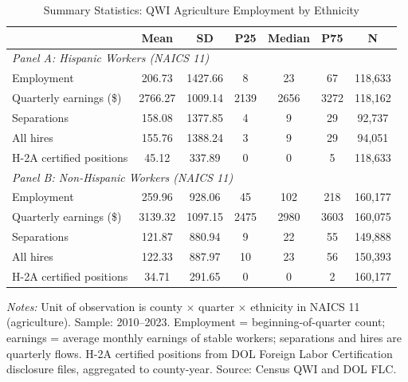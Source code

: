 \begin{table}[htbp]
\centering
\caption{Summary Statistics: QWI Agriculture Employment by Ethnicity}
\label{tab:sumstats}
\small
\begin{tabular}{lcccccc}
\hline\hline
 & Mean & SD & P25 & Median & P75 & N \\
\hline
\multicolumn{7}{l}{\textit{Panel A: Hispanic Workers (NAICS 11)}} \\
Employment & 206.73 & 1427.66 & 8 & 23 & 67 & 118,633 \\
Quarterly earnings (\$) & 2766.27 & 1009.14 & 2139 & 2656 & 3272 & 118,162 \\
Separations & 158.08 & 1377.85 & 4 & 9 & 29 & 92,737 \\
All hires & 155.76 & 1388.24 & 3 & 9 & 29 & 94,051 \\
H-2A certified positions & 45.12 & 337.89 & 0 & 0 & 5 & 118,633 \\
\hline
\multicolumn{7}{l}{\textit{Panel B: Non-Hispanic Workers (NAICS 11)}} \\
Employment & 259.96 & 928.06 & 45 & 102 & 218 & 160,177 \\
Quarterly earnings (\$) & 3139.32 & 1097.15 & 2475 & 2980 & 3603 & 160,075 \\
Separations & 121.87 & 880.94 & 9 & 22 & 55 & 149,888 \\
All hires & 122.33 & 887.97 & 10 & 23 & 56 & 150,393 \\
H-2A certified positions & 34.71 & 291.65 & 0 & 0 & 2 & 160,177 \\
\hline\hline
\end{tabular}
\begin{tablenotes}
\item \textit{Notes:} Unit of observation is county $\times$ quarter $\times$ ethnicity in NAICS 11 (agriculture). Sample: 2010--2023. Employment = beginning-of-quarter count; earnings = average monthly earnings of stable workers; separations and hires are quarterly flows. H-2A certified positions from DOL Foreign Labor Certification disclosure files, aggregated to county-year. Source: Census QWI and DOL FLC.
\end{tablenotes}
\end{table}

